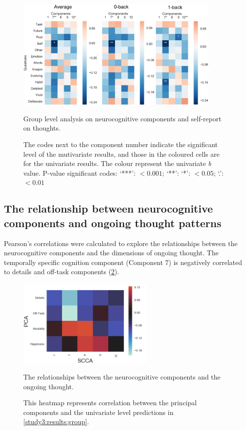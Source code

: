 \begin{figure}[H]
    \centering
    \includegraphics[width=0.9\textwidth]{study3/image/study3fig4.png}
    \caption{Group level analysis on neurocognitive components and  self-report on thoughts.}
    \caption*{
    \footnotesize{The codes next to the component number indicate the significant level of the mutivariate results, and those in the coloured cells are for the univariate results. The colour represent the univariate \textit{b} value. P-value significant codes: `***': \(<0.001\);  `**': \; `*': \(<0.05\); `.': \(<0.01\)}
    }
    \label{fig:study3:fig4}
\end{figure}


\subsection{The relationship between neurocognitive components and ongoing thought patterns}

Pearson's correlations were calculated to explore the relationships between the neurocognitive components and the dimensions of ongoing thought. The temporally specific cognition component (Component 7) is negatively correlated to details and off-task components (\cref{fig:study3:figcorr}). 


\begin{figure}[H]
    \centering
    \includegraphics[width=0.6\textwidth]{study3/image/pca_cca_corr.png}
    \caption{The relationships between the neurocognitive components and the ongoing thought.}
    \caption*{This heatmap represents correlation between the principal components and the univariate level predictions in \cref{study3:results:group}.}
    \label{fig:study3:figcorr}
\end{figure}

